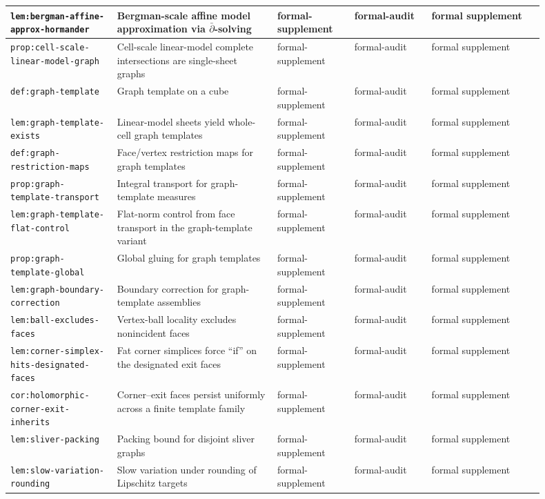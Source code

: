 \documentclass[11pt]{article}
\numberwithin{equation}{section}  %
\theoremstyle{plain}
\theoremstyle{definition}
\theoremstyle{remark}
\begin{document}
\begin{longtable}{|p{0.18\linewidth}|p{0.27\linewidth}|p{0.13\linewidth}|p{0.13\linewidth}|p{0.19\linewidth}|}
\texttt{lem:bergman-affine-approx-hormander} & Bergman-scale affine model approximation via $\bar\partial$-solving & formal-supplement & formal-audit & formal supplement \\ \hline
\texttt{prop:cell-scale-linear-model-graph} & Cell-scale linear-model complete intersections are single-sheet graphs & formal-supplement & formal-audit & formal supplement \\ \hline
\texttt{def:graph-template} & Graph template on a cube & formal-supplement & formal-audit & formal supplement \\ \hline
\texttt{lem:graph-template-exists} & Linear-model sheets yield whole-cell graph templates & formal-supplement & formal-audit & formal supplement \\ \hline
\texttt{def:graph-restriction-maps} & Face/vertex restriction maps for graph templates & formal-supplement & formal-audit & formal supplement \\ \hline
\texttt{prop:graph-template-transport} & Integral transport for graph-template measures & formal-supplement & formal-audit & formal supplement \\ \hline
\texttt{lem:graph-template-flat-control} & Flat-norm control from face transport in the graph-template variant & formal-supplement & formal-audit & formal supplement \\ \hline
\texttt{prop:graph-template-global} & Global gluing for graph templates & formal-supplement & formal-audit & formal supplement \\ \hline
\texttt{lem:graph-boundary-correction} & Boundary correction for graph-template assemblies & formal-supplement & formal-audit & formal supplement \\ \hline
\texttt{lem:ball-excludes-faces} & Vertex-ball locality excludes nonincident faces & formal-supplement & formal-audit & formal supplement \\ \hline
\texttt{lem:corner-simplex-hits-designated-faces} & {Fat corner simplices force ``if'' on the designated exit faces} & formal-supplement & formal-audit & formal supplement \\ \hline
\texttt{cor:holomorphic-corner-exit-inherits} & {Corner--exit faces persist uniformly across a finite template family} & formal-supplement & formal-audit & formal supplement \\ \hline
\texttt{lem:sliver-packing} & Packing bound for disjoint sliver graphs & formal-supplement & formal-audit & formal supplement \\ \hline
\texttt{lem:slow-variation-rounding} & Slow variation under rounding of Lipschitz targets & formal-supplement & formal-audit & formal supplement \\ \hline

\end{longtable}
\end{document}
